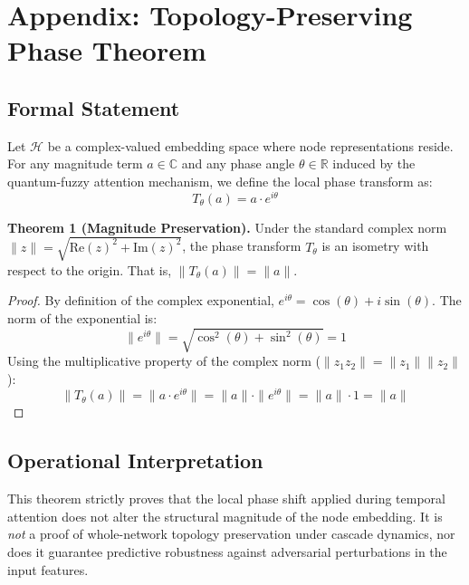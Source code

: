 
\section{Appendix: Topology-Preserving Phase Theorem}

\subsection{Formal Statement}
Let $\mathcal{H}$ be a complex-valued embedding space where node representations reside. For any magnitude term $a \in \mathbb{C}$ and any phase angle $\theta \in \mathbb{R}$ induced by the quantum-fuzzy attention mechanism, we define the local phase transform as:
\begin{equation}
T_{\theta}(a) = a \cdot e^{i\theta}
\end{equation}

\textbf{Theorem 1 (Magnitude Preservation).} Under the standard complex norm $\|z\| = \sqrt{\text{Re}(z)^2 + \text{Im}(z)^2}$, the phase transform $T_{\theta}$ is an isometry with respect to the origin. That is, $\|T_{\theta}(a)\| = \|a\|$.

\begin{proof}
By definition of the complex exponential, $e^{i\theta} = \cos(\theta) + i\sin(\theta)$.
The norm of the exponential is:
\begin{equation}
\|e^{i\theta}\| = \sqrt{\cos^2(\theta) + \sin^2(\theta)} = 1
\end{equation}
Using the multiplicative property of the complex norm ($\|z_1 z_2\| = \|z_1\| \|z_2\|$):
\begin{equation}
\|T_{\theta}(a)\| = \|a \cdot e^{i\theta}\| = \|a\| \cdot \|e^{i\theta}\| = \|a\| \cdot 1 = \|a\|
\end{equation}
\end{proof}

\subsection{Operational Interpretation}
This theorem strictly proves that the local phase shift applied during temporal attention does not alter the structural magnitude of the node embedding. It is \textit{not} a proof of whole-network topology preservation under cascade dynamics, nor does it guarantee predictive robustness against adversarial perturbations in the input features.
